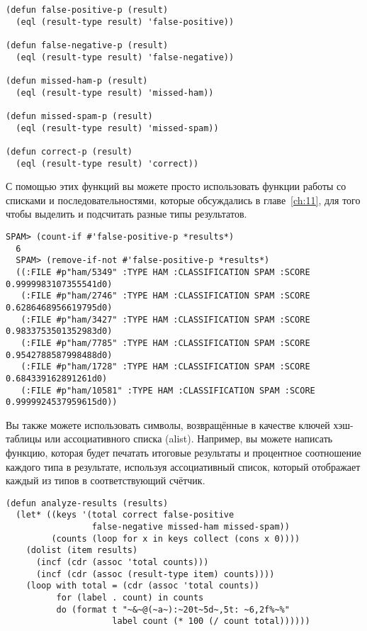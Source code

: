 \begin{lstlisting}
(defun false-positive-p (result)
  (eql (result-type result) 'false-positive))

(defun false-negative-p (result)
  (eql (result-type result) 'false-negative))

(defun missed-ham-p (result)
  (eql (result-type result) 'missed-ham))

(defun missed-spam-p (result)
  (eql (result-type result) 'missed-spam))

(defun correct-p (result)
  (eql (result-type result) 'correct))
\end{lstlisting}

С помощью этих функций вы можете просто использовать функции работы со списками и
последовательностями, которые обсуждались в главе~\ref{ch:11}, для того чтобы выделить и
подсчитать разные типы результатов.

\begin{lstlisting}[style=lisprepl]
  SPAM> (count-if #'false-positive-p *results*)
  6
  SPAM> (remove-if-not #'false-positive-p *results*)
  ((:FILE #p"ham/5349" :TYPE HAM :CLASSIFICATION SPAM :SCORE 0.9999983107355541d0)
   (:FILE #p"ham/2746" :TYPE HAM :CLASSIFICATION SPAM :SCORE 0.6286468956619795d0)
   (:FILE #p"ham/3427" :TYPE HAM :CLASSIFICATION SPAM :SCORE 0.9833753501352983d0)
   (:FILE #p"ham/7785" :TYPE HAM :CLASSIFICATION SPAM :SCORE 0.9542788587998488d0)
   (:FILE #p"ham/1728" :TYPE HAM :CLASSIFICATION SPAM :SCORE 0.684339162891261d0)
   (:FILE #p"ham/10581" :TYPE HAM :CLASSIFICATION SPAM :SCORE 0.9999924537959615d0))
\end{lstlisting}

Вы также можете использовать символы, возвращённые  в качестве ключей
хэш-таблицы или ассоциативного списка (alist).  Например, вы можете написать функцию,
которая будет печатать итоговые результаты и процентное соотношение каждого типа в
результате, используя ассоциативный список, который отображает каждый из типов в
соответствующий счётчик.

\begin{lstlisting}
(defun analyze-results (results)
  (let* ((keys '(total correct false-positive 
                 false-negative missed-ham missed-spam))
         (counts (loop for x in keys collect (cons x 0))))
    (dolist (item results)
      (incf (cdr (assoc 'total counts)))
      (incf (cdr (assoc (result-type item) counts))))
    (loop with total = (cdr (assoc 'total counts))
          for (label . count) in counts
          do (format t "~&~@(~a~):~20t~5d~,5t: ~6,2f%~%"
                     label count (* 100 (/ count total))))))
\end{lstlisting}

